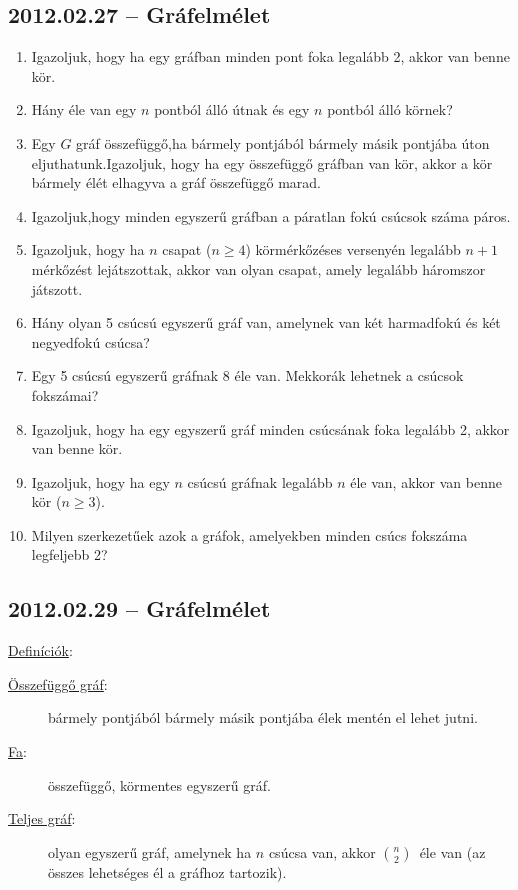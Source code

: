 \documentclass{article}
\begin{document}
\subsection*{2012.02.27 -- Gráfelmélet }
\begin{enumerate}

\item Igazoljuk, hogy ha egy gráfban minden pont foka legalább 2, akkor van benne kör. 

\item Hány éle van egy $n$ pontból álló útnak és egy $n$ pontból álló körnek?

\item Egy $G$ gráf összefüggő,ha bármely pontjából bármely másik pontjába úton eljuthatunk.Igazoljuk, hogy ha egy összefüggő gráfban van kör, akkor a kör bármely élét elhagyva a gráf összefüggő marad.

\item Igazoljuk,hogy minden egyszerű gráfban a páratlan fokú csúcsok száma páros.

\item Igazoljuk, hogy ha $n$ csapat ($n\geq 4$) körmérkőzéses versenyén legalább $n+1$ mérkőzést lejátszottak, akkor van olyan csapat, amely legalább háromszor játszott.

\item Hány olyan 5 csúcsú egyszerű gráf van, amelynek van két harmadfokú és két negyedfokú csúcsa?

\item Egy 5 csúcsú egyszerű gráfnak 8 éle van. Mekkorák lehetnek a csúcsok fokszámai?

\item Igazoljuk, hogy ha egy egyszerű gráf minden csúcsának foka legalább 2, akkor van benne kör.

\item Igazoljuk, hogy ha egy $n$ csúcsú gráfnak legalább $n$ éle van, akkor van benne kör ($n\geq 3$).

\item Milyen szerkezetűek azok a gráfok, amelyekben minden csúcs fokszáma legfeljebb 2?
\end{enumerate}


\subsection*{2012.02.29 -- Gráfelmélet }

\underline{Definíciók}:

\begin{description}
\item[\underline{Összefüggő gráf}:] bármely pontjából bármely másik pontjába élek mentén el lehet jutni.

\item[\underline{Fa}:] összefüggő, körmentes egyszerű gráf.

\item[\underline{Teljes gráf}:] olyan egyszerű gráf, amelynek ha $n$ csúcsa van, akkor $\binom{n}{2}$\ éle van (az összes lehetséges él a gráfhoz tartozik).

\end{description}
\end{document}
